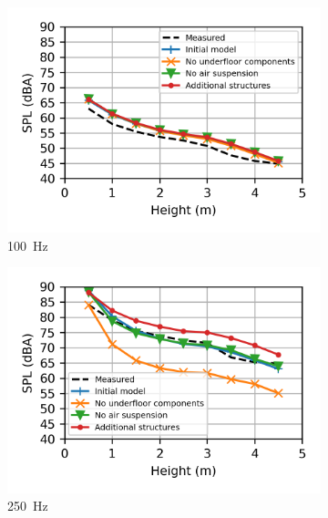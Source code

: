 \begin{figure}
	\centering
	\begin{subfigure}[b]{0.49\textwidth}
		\centering
		\includegraphics{fig/chap5/geometry_variation/third_octave_over_height/100_Hz.png}
		\caption{\SI{100}{\hertz}}
	\end{subfigure}
	\hfill
	\begin{subfigure}[b]{0.49\textwidth}
		\centering
		\includegraphics{fig/chap5/geometry_variation/third_octave_over_height/250_Hz.png}
		\caption{\SI{250}{\hertz}}
	\end{subfigure}
	\\
	\begin{subfigure}[b]{0.49\textwidth}
		\centering

\end{subfigure}
\end{figure}
